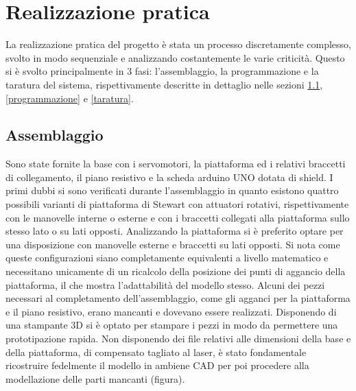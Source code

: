 \documentclass[11pt]{article}
\begin{document}
\newpage



\section{Realizzazione pratica}
La realizzazione pratica del progetto è stata un processo discretamente complesso, svolto in modo sequenziale e analizzando costantemente le varie criticità. Questo si è svolto principalmente in 3 fasi: l'assemblaggio, la programmazione e la taratura del sistema, rispettivamente descritte in dettaglio nelle sezioni \ref{assemblaggio}, \ref{programmazione} e \ref{taratura}.

\subsection{Assemblaggio}\label{assemblaggio}
Sono state fornite la base con i servomotori, la piattaforma ed i relativi braccetti di collegamento, il piano resistivo e la scheda arduino UNO dotata di shield. I primi dubbi si sono verificati durante l'assemblaggio in quanto esistono quattro possibili varianti di piattaforma di Stewart con attuatori rotativi, rispettivamente con le manovelle interne o esterne e con i braccetti collegati alla piattaforma sullo stesso lato o su lati opposti. Analizzando la piattaforma si è preferito optare per una disposizione con manovelle esterne e braccetti su lati opposti. Si nota come queste configurazioni siano completamente equivalenti a livello matematico e necessitano unicamente di un ricalcolo della posizione dei punti di aggancio della piattaforma, il che mostra l'adattabilità del modello stesso. Alcuni dei pezzi necessari al completamento dell'assemblaggio, come gli agganci per la piattaforma e il piano resistivo, erano mancanti e dovevano essere realizzati. Disponendo di una stampante 3D si è optato per stampare i pezzi in modo da permettere una prototipazione rapida. Non disponendo dei file relativi alle dimensioni della base e della piattaforma, di compensato tagliato al laser, è stato fondamentale ricostruire fedelmente il modello in ambiene CAD per poi procedere alla modellazione delle parti mancanti (figura). 
\end{document}
